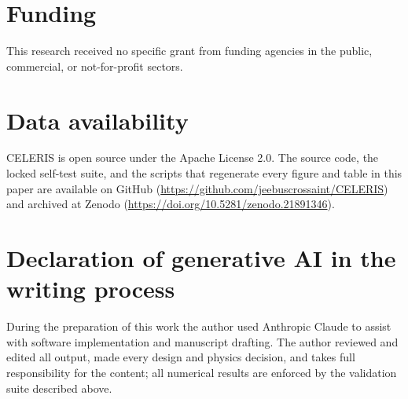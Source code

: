 \documentclass[preprint,12pt]{elsarticle}
\begin{document}
\section*{Funding}
This research received no specific grant from funding agencies in the public,
commercial, or not-for-profit sectors.

\section*{Data availability}
CELERIS is open source under the Apache License 2.0. The source code, the locked
self-test suite, and the scripts that regenerate every figure and table in this paper
are available on GitHub (\url{https://github.com/jeebuscrossaint/CELERIS}) and archived
at Zenodo (\url{https://doi.org/10.5281/zenodo.21891346}).

\section*{Declaration of generative AI in the writing process}
During the preparation of this work the author used Anthropic Claude to assist with
software implementation and manuscript drafting. The author reviewed and edited all
output, made every design and physics decision, and takes full responsibility for the
content; all numerical results are enforced by the validation suite described above.



\end{document}
